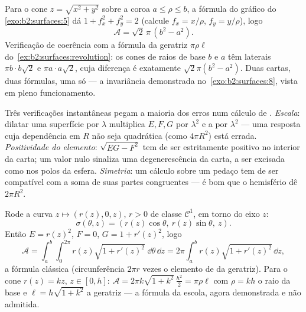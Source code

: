 \begin{example}\label{ex:b2:surfaces:conearea}
Para o cone $z = \sqrt{x^2 + y^2}$ sobre a coroa $a \leq
\rho \leq b$, a fórmula do gráfico do
\cref{exo:b2:surfaces:5} dá $1 + f_x^2 + f_y^2 = 2$
(calcule $f_x = x/\rho$, $f_y = y/\rho$), logo
\[
\mathcal A = \sqrt2\,\pi\,(b^2 - a^2) .
\]
Verificação de coerência com a fórmula da geratriz $\pi\rho\ell$
do~\cref{ex:b2:surfaces:revolution}: os cones  de raios de
base $b$ e $a$ têm  laterais $\pi b\cdot b\sqrt2$ e
$\pi a\cdot a\sqrt2$, cuja diferença é exatamente
$\sqrt2\pi(b^2 - a^2)$. Duas cartas, duas fórmulas, uma só 
--- a invariância demonstrada no~\cref{exo:b2:surfaces:8}, vista
em pleno funcionamento.
\end{example}

\begin{remark}
Três verificações instantâneas pegam a maioria dos erros num cálculo
de . \emph{Escala}: dilatar uma superfície por $\lambda$
multiplica $E, F, G$ por $\lambda^2$ e a  por
$\lambda^2$ --- uma resposta cuja dependência em $R$ não seja
quadrática (como $4\pi R^2$) está errada. \emph{Positividade do
elemento}: $\sqrt{EG - F^2}$ tem de ser estritamente positivo no
interior da carta; um valor nulo sinaliza uma degenerescência da carta,
a ser excisada como nos polos da esfera. \emph{Simetria}: um
cálculo sobre um pedaço  tem de ser compatível com a
soma de suas partes congruentes --- é bom que o hemisfério
dê $2\pi R^2$.
\end{remark}

\begin{example}\label{ex:b2:surfaces:revolution}
Rode a curva $z \mapsto (r(z), 0, z)$, $r > 0$ de classe
$\mathcal{C}^1$, em torno do eixo $z$:
\[
\sigma(\theta, z) = (r(z)\cos\theta,\ r(z)\sin\theta,\ z).
\]
Então $E = r(z)^2$, $F = 0$, $G = 1 + r'(z)^2$, logo
\[
\mathcal{A} = \int_a^b\!\!\int_0^{2\pi}
r(z)\sqrt{1 + r'(z)^2}\;\dd\theta\,\dd z
= 2\pi\int_a^b r(z)\sqrt{1 + r'(z)^2}\,\dd z ,
\]
a fórmula clássica (circunferência $2\pi r$ vezes o elemento de
 da geratriz). Para o cone $r(z) = kz$, $z \in [0, h]$: $\mathcal
A = 2\pi k\sqrt{1 + k^2}\,\frac{h^2}{2} = \pi \rho \ell$ com
$\rho = kh$ o raio da base e $\ell = h\sqrt{1 + k^2}$ a geratriz
--- a fórmula da escola, agora demonstrada e não admitida.
\end{example}

